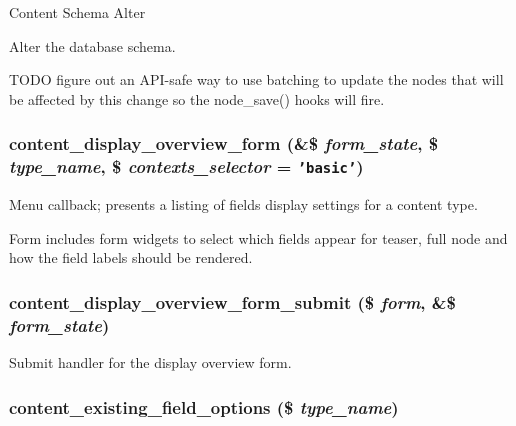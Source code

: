 Content Schema Alter

Alter the database schema.

TODO figure out an API-safe way to use batching to update the nodes that will be affected by this change so the node\_\-save() hooks will fire. \hypertarget{content_8admin_8inc_563e5f30b56e1175d33897e0fe634da1}{
\subsubsection[{content\_\-display\_\-overview\_\-form}]{\setlength{\rightskip}{0pt plus 5cm}content\_\-display\_\-overview\_\-form (\&\$ {\em form\_\-state}, \/  \$ {\em type\_\-name}, \/  \$ {\em contexts\_\-selector} = {\tt 'basic'})}}
\label{content_8admin_8inc_563e5f30b56e1175d33897e0fe634da1}


Menu callback; presents a listing of fields display settings for a content type.

Form includes form widgets to select which fields appear for teaser, full node and how the field labels should be rendered. \hypertarget{content_8admin_8inc_05a72014ccf1e0f3ea42aeeaaf671db1}{
\subsubsection[{content\_\-display\_\-overview\_\-form\_\-submit}]{\setlength{\rightskip}{0pt plus 5cm}content\_\-display\_\-overview\_\-form\_\-submit (\$ {\em form}, \/  \&\$ {\em form\_\-state})}}
\label{content_8admin_8inc_05a72014ccf1e0f3ea42aeeaaf671db1}


Submit handler for the display overview form. \hypertarget{content_8admin_8inc_8166e7b0e08ac7fd41f785a6e964525f}{
\subsubsection[{content\_\-existing\_\-field\_\-options}]{\setlength{\rightskip}{0pt plus 5cm}content\_\-existing\_\-field\_\-options (\$ {\em type\_\-name})}}
\label{content_8admin_8inc_8166e7b0e08ac7fd41f785a6e964525f}


